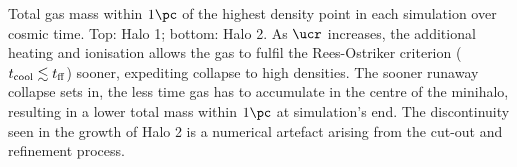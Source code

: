 \label{fig:collapse}
Total gas mass within $1\pc$ of the highest density point in each simulation over cosmic time.
Top: Halo 1; bottom: Halo 2.
As $\ucr$ increases, the additional heating and ionisation allows the gas to fulfil the Rees-Ostriker criterion ($t_{\rm cool} \lesssim t_{\rm ff}$) sooner, expediting collapse to high densities.  
The sooner runaway collapse sets in, the less time gas has to accumulate in the centre of the minihalo, resulting in a lower total mass within $1\pc$ at simulation's end.
The discontinuity seen in the growth of Halo 2 is a numerical artefact arising from the cut-out and refinement process.